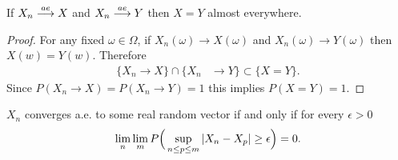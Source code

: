 \begin{theorem}
If  $X_n\overset{\small ae} \longrightarrow X$ and  $X_n\overset{\small ae} \longrightarrow Y$ then  $X=Y$ almost everywhere.
\end{theorem}
\begin{proof}
For any fixed $\omega \in \Omega$, if $X_n(\omega)\rightarrow X(\omega)$ and  $X_n(\omega)\rightarrow Y(\omega)$ then $X(w)=Y(w)$. Therefore
\begin{align*}
\{X_n\rightarrow X\}\cap \{X_n &\rightarrow Y\}\subset \{X=Y\}.
\end{align*}
Since $P(X_n\rightarrow X)= P(X_n\rightarrow Y) = 1$ this implies $P(X=Y)=1$.
\end{proof}



\begin{theorem}
$X_n$ converges a.e. to some real random vector if and only if for every $\epsilon >0$
\begin{equation}
\label{cauchy for ae}
\lim_{n}\lim_{m} P\Bigl(\, \displaystyle\sup_{n\leq p\leq m} |X_n-X_p| \geq \epsilon \Bigr)=0.
\end{equation}
\end{theorem}
